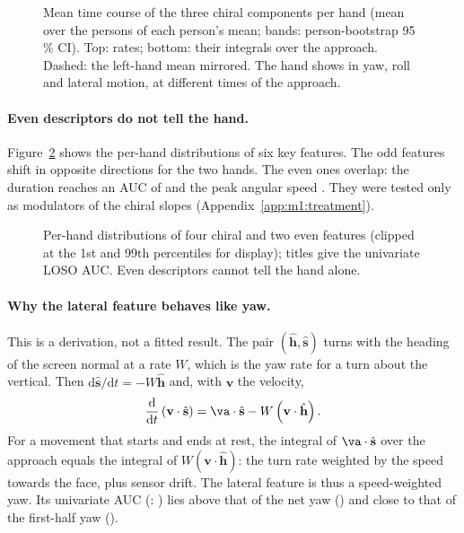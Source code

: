 \begin{figure}[tbp]
  \centering
  \caption{Mean time course of the three chiral components per hand (mean over the
   persons of each person's mean; bands: person-bootstrap 95\,\% CI). Top:
  rates; bottom: their integrals over the approach. Dashed: the left-hand mean mirrored. The hand
  shows in yaw, roll and lateral motion, at different times of the approach.}
  \label{fig:M1_02_chiral_components}
\end{figure}

\paragraph{Even descriptors do not tell the hand.} Figure~\ref{fig:M1_03_key_distributions} shows
the per-hand distributions of six key features. The odd features shift in opposite directions for the
two hands. The even ones overlap: the duration reaches an AUC of  and the
peak angular speed . They were tested only as modulators of the chiral
slopes (Appendix~\ref{app:m1:treatment}).

\begin{figure}[tbp]
  \centering
  \caption{Per-hand distributions of four chiral and two even features (clipped at the 1st and 99th
  percentiles for display); titles give the univariate LOSO AUC. Even descriptors cannot tell the
  hand alone.}
  \label{fig:M1_03_key_distributions}
\end{figure}

\paragraph{Why the lateral feature behaves like yaw.} This is a derivation, not a fitted result. The
pair $(\hat{\mathbf h}, \hat{\mathbf s})$ turns with the heading of the screen normal at a rate $W$,
which is the yaw rate for a turn about the vertical. Then
$\mathrm{d}\hat{\mathbf s}/\mathrm{d}t = -W\hat{\mathbf h}$ and, with $\mathbf v$ the velocity,
\begin{equation}
  \frac{\mathrm{d}}{\mathrm{d}t}\left(\mathbf v\cdot\hat{\mathbf s}\right)
  = \va\cdot\hat{\mathbf s} - W\left(\mathbf v\cdot\hat{\mathbf h}\right) .
  \label{eq:m1-lateral}
\end{equation}
For a movement that starts and ends at rest, the integral of $\va\cdot\hat{\mathbf s}$ over the
approach equals the integral of $W(\mathbf v\cdot\hat{\mathbf h})$: the turn rate weighted by the speed
towards the face, plus sensor drift. The lateral feature is thus a speed-weighted yaw. Its univariate
AUC (: ) lies above that of the net yaw
() and close to that of the first-half yaw ().

